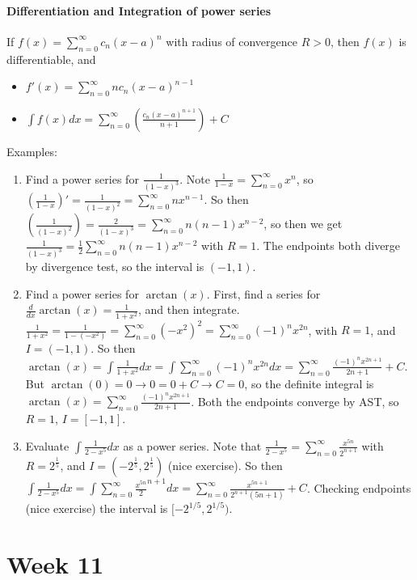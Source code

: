\documentclass[10pt,letter]{article}
\begin{document}
\paragraph{Differentiation and Integration of power series} If $f(x)=\sum_{n=0}^\infty c_n(x-a)^n$ with radius of convergence $R>0$, then $f(x)$ is differentiable, and \begin{itemize}
    \item $f'(x)=\sum_{n=0}^\infty nc_n(x-a)^{n-1}$ 
    \item $\int f(x)dx = \sum_{n=0}^\infty \left(\frac{c_n(x-a)^{n+1}}{n+1}\right) + C$
\end{itemize} 
Examples: \begin{enumerate}
    \item Find a power series for $\frac{1}{(1-x)^3}$. Note $\frac{1}{1-x}=\sum_{n=0}^\infty x^n$, so $\left(\frac{1}{1-x}\right)' = \frac{1}{(1-x)^2} = \sum_{n=0}^\infty nx^{n-1}$. So then $\left(\frac{1}{(1-x)^2}\right)=\frac{2}{(1-x)^3} = \sum_{n=0}^\infty n(n-1)x^{n-2}$, so then we get $\frac{1}{(1-x)^3} = \frac{1}{2}\sum_{n=0}^\infty n(n-1)x^{n-2}$ with $R=1$. The endpoints both diverge by divergence test, so the interval is $(-1,1)$. 
    \item Find a power series for $\arctan(x)$. First, find a series for $\frac{d}{dx}\arctan(x) = \frac{1}{1+x^2}$, and then integrate. $\frac{1}{1+x^2}=\frac{1}{1-(-x^2)} = \sum_{n=0}^\infty (-x^2)^2=\sum_{n=0}^\infty(-1)^nx^{2n}$, with $R=1$, and $I=(-1,1)$. So then $\arctan(x)=\int\frac{1}{1+x^2}dx=\int\sum_{n=0}^\infty(-1)^nx^{2n}dx=\sum_{n=0}^\infty\frac{(-1)^nx^{2n+1}}{2n+1}+C$. But $\arctan(0)=0\rightarrow 0 =0+C\rightarrow C=0$, so the definite integral is $\arctan(x)=\sum_{n=0}^\infty\frac{(-1)^nx^{2n+1}}{2n+1}$. Both the endpoints converge by AST, so $R=1$, $I=[-1,1]$. 
    \item Evaluate $\int\frac{1}{2-x^5}dx$ as a power series. Note that $\frac{1}{2-x^5} = \sum_{n=0}^\infty\frac{x^{5n}}{2^{n+1}}$  with $R = 2^{\frac{1}{5}}$, and $I = (-2^{\frac{1}{5}}, 2^{\frac{1}{5}})$ (nice exercise). So then $\int\frac{1}{2-x^5}dx = \int\sum_{n=0}^\infty\frac{x^{5n}}2^{n+1}dx = \sum_{n=0}^\infty\frac{x^{5n+1}}{2^{n+1}(5n+1)} + C$. Checking endpoints (nice exercise) the interval is $[-2^{1/5}, 2^{1/5})$. 
\end{enumerate}


\pagebreak

\section*{Week 11} 
\end{document}
